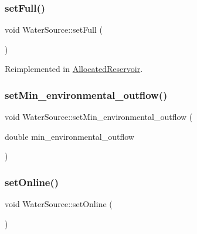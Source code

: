 \mbox{\label{classWaterSource_a5f8007eb1ae604cfaa67ebb4c0c46eb1}} 
\subsubsection{\texorpdfstring{set\+Full()}{setFull()}}
{\footnotesize\ttfamily void Water\+Source\+::set\+Full (\begin{DoxyParamCaption}{ }\end{DoxyParamCaption})\hspace{0.3cm}{\ttfamily [virtual]}}



Reimplemented in \mbox{\hyperlink{classAllocatedReservoir_aea294cbca1e1630a1307072632d14b05}{Allocated\+Reservoir}}.

\mbox{\label{classWaterSource_a406246432d29f49189d53207ab1d895a}} 
\subsubsection{\texorpdfstring{set\+Min\+\_\+environmental\+\_\+outflow()}{setMin\_environmental\_outflow()}}
{\footnotesize\ttfamily void Water\+Source\+::set\+Min\+\_\+environmental\+\_\+outflow (\begin{DoxyParamCaption}\item[{double}]{min\+\_\+environmental\+\_\+outflow }\end{DoxyParamCaption})}

\mbox{\label{classWaterSource_ab3396e2915db91a6c82e0f29c7889df4}} 
\subsubsection{\texorpdfstring{set\+Online()}{setOnline()}}
{\footnotesize\ttfamily void Water\+Source\+::set\+Online (\begin{DoxyParamCaption}{ }\end{DoxyParamCaption})\hspace{0.3cm}{\ttfamily [virtual]}}



